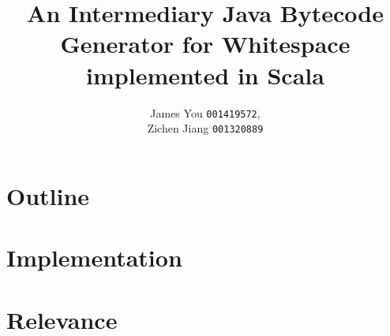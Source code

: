\documentclass[10pt,letter]{article}
\title{An Intermediary Java Bytecode Generator for Whitespace implemented in Scala}
\author{James You \texttt{001419572},
	\\ Zichen Jiang \texttt{001320889}}
\begin{document}
	
	\maketitle
	
	\begin{abstract}
		
	\end{abstract}

	\section{Outline}
	
	\section{Implementation}
	
	\section{Relevance}
	
\end{document}
